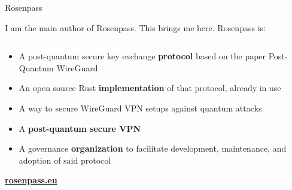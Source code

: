 \begin{frame}{Rosenpass}

  I am the main author of Rosenpass. This brings me here. Rosenpass is:

  \begin{columns}[fullwidth,c]

    \begin{column}{.7\linewidth}
      \begin{itemize}
        \item A post-quantum secure key exchange \textbf{protocol}
          {\small based on the paper Post-Quantum WireGuard~\citePqwg}
        \item An open source Rust \textbf{implementation} of that protocol, already in use
        \item A way to secure WireGuard VPN setups against quantum attacks
        \item A \textbf{post-quantum secure VPN}
        \item A governance \textbf{organization} to facilitate development, maintenance, and adoption of said protocol
      \end{itemize}
      \bigskip
      \textbf{\url{rosenpass.eu}}
    \end{column}%
  \end{columns}
\end{frame}
